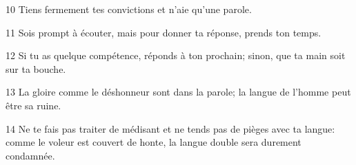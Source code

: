 
10 Tiens fermement tes convictions et n’aie qu’une parole.

11 Sois prompt à écouter, mais pour donner ta réponse, prends ton temps.

12 Si tu as quelque compétence, réponds à ton prochain; sinon, que ta main soit sur ta bouche.

13 La gloire comme le déshonneur sont dans la parole; la langue de l’homme peut être sa ruine.

14 Ne te fais pas traiter de médisant et ne tends pas de pièges avec ta langue: comme le voleur est couvert de honte, la langue double sera durement condamnée.